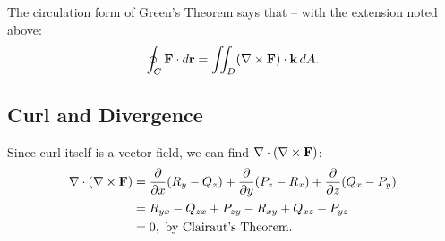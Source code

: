 The circulation form of Green’s Theorem says that – with the extension noted above:
\[
    \oint_C \mathbf{F} \cdot d\mathbf{r} = \iint_D (\nabla \times \mathbf{F}) \cdot \mathbf{k} \, dA.
\]

\subsection{Curl and Divergence}

Since curl itself is a vector field, we can find \(\nabla \cdot (\nabla \times \mathbf{F})\):
\begin{align*}
    \nabla \cdot (\nabla \times \mathbf{F}) &= \frac{\partial}{\partial x} (R_y - Q_z) + \frac{\partial}{\partial y} (P_z - R_x) + \frac{\partial}{\partial z} (Q_x - P_y) \\
    &= R_{yx} - Q_{zx} + P_{zy} - R_{xy} + Q_{xz} - P_{yz} \\
    &= 0, \text{ by Clairaut's Theorem.}
\end{align*}
